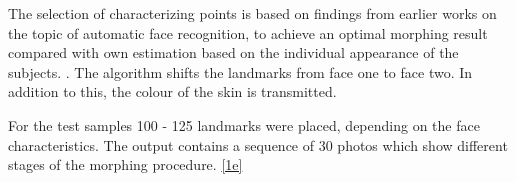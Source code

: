 The selection of characterizing points  is based on findings  from earlier works on the topic of automatic face recognition, to achieve an optimal morphing result compared with own estimation based on the individual appearance of the subjects. \cite[60ff]{jain2008handbook} \cite{amos2016openface}  .
The algorithm shifts the landmarks from face one to face two. In addition to this, the colour of the skin is transmitted. 

For the test samples 100 - 125 landmarks were placed, depending on the face characteristics. The output contains a sequence of 30 photos which show different stages of the morphing procedure. \ref{1e}


